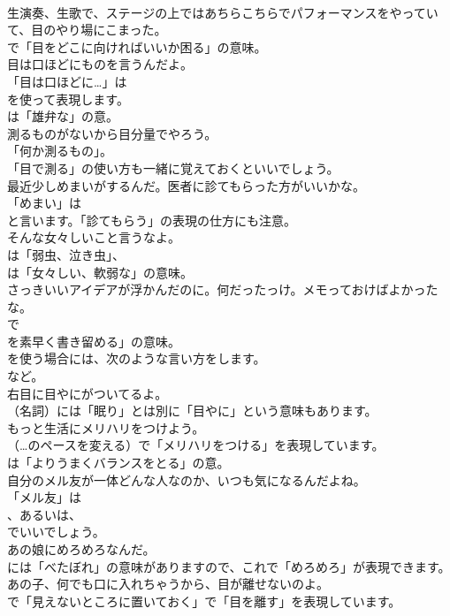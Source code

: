 \documentclass[8pt]{extreport}
\begin{document}
\begin{CJK}{UTF8}{min}
\\	生演奏、生歌で、ステージの上ではあちらこちらでパフォーマンスをやっていて、目のやり場にこまった。 
\\	で「目をどこに向ければいいか困る」の意味。	
\\	目は口ほどにものを言うんだよ。 
\\	「目は口ほどに…」は 
\\	を使って表現します。
\\	は「雄弁な」の意。	
\\	測るものがないから目分量でやろう。 
\\	「何か測るもの」。
\\	「目で測る」の使い方も一緒に覚えておくといいでしょう。	
\\	最近少しめまいがするんだ。医者に診てもらった方がいいかな。 
\\	「めまい」は
\\	と言います。「診てもらう」の表現の仕方にも注意。	
\\	そんな女々しいこと言うなよ。 
\\	は「弱虫、泣き虫」、
\\	は「女々しい、軟弱な」の意味。	
\\	さっきいいアイデアが浮かんだのに。何だったっけ。メモっておけばよかったな。 
\\	で
\\	を素早く書き留める」の意味。
\\	を使う場合には、次のような言い方をします。
\\	など。	
\\	右目に目やにがついてるよ。 
\\	（名詞）には「眠り」とは別に「目やに」という意味もあります。	
\\	もっと生活にメリハリをつけよう。 
\\	（…のペースを変える）で「メリハリをつける」を表現しています。
\\	は「よりうまくバランスをとる」の意。	
\\	自分のメル友が一体どんな人なのか、いつも気になるんだよね。 
\\	「メル友」は 
\\	、あるいは、
\\	でいいでしょう。	
\\	あの娘にめろめろなんだ。 
\\	には「べたぼれ」の意味がありますので、これで「めろめろ」が表現できます。	
\\	あの子、何でも口に入れちゃうから、目が離せないのよ。 
\\	で「見えないところに置いておく」で「目を離す」を表現しています。	

\end{CJK}
\end{document}
